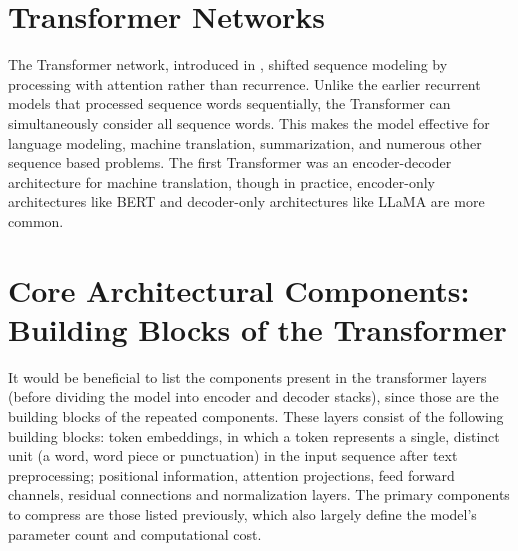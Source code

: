 %
%
%
%

\newpage
\section{Transformer Networks}
The Transformer network, introduced in \cite{vaswani2017attention}, shifted sequence modeling by processing with attention rather than recurrence. Unlike the earlier recurrent models that processed sequence words sequentially, the Transformer can simultaneously consider all sequence words. This makes the model effective for language modeling, machine translation, summarization, and numerous other sequence based problems. The first Transformer was an encoder-decoder architecture for machine translation, though in practice, encoder-only architectures like BERT \cite{devlin2019bert} and decoder-only architectures like LLaMA \cite{touvron2023llama2} are more common.

\section{Core Architectural Components: Building Blocks of the Transformer}

It would be beneficial to list the components present in the transformer layers (before dividing the model into encoder and decoder stacks), since those are the building blocks of the repeated components. These layers consist of the following building blocks: token embeddings, in which a token represents a single, distinct unit (a word, word piece or punctuation) in the input sequence after text preprocessing; positional information, attention projections, feed forward channels, residual connections and normalization layers. The primary components to compress are those listed previously, which also largely define the model's parameter count and computational cost.
